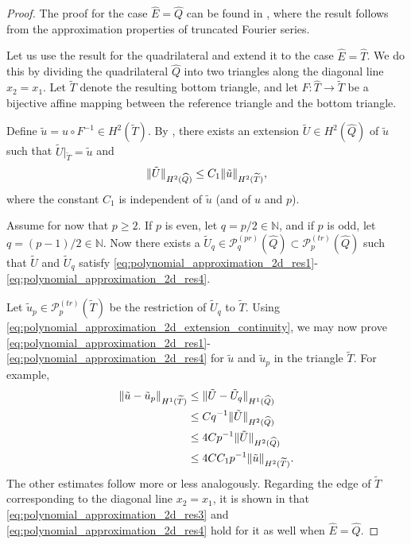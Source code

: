 \documentclass[english, 12pt, a4paper, sci, utf8, a-2b, online]{aaltothesis}
\theoremstyle{definition}
\theoremstyle{plain}
\DeclarePairedDelimiter\norm{\lVert}{\rVert}
\numberwithin{equation}{section}
\begin{document}
\begin{proof}
    The proof for the case $\widehat{E} = \widehat{Q}$
    can be found in \cite[Lemma 3.1]{babuskasuri1987},
    where the result follows from the approximation properties
    of truncated Fourier series.

    Let us use the result for the quadrilateral
    and extend it to the case $\widehat{E} = \widehat{T}$.
    We do this by
    dividing the quadrilateral $\widehat{Q}$ into two triangles
    along the diagonal line $x_2 = x_1$.
    Let $\widetilde{T}$ denote the resulting bottom triangle,
    and let $F: \widehat{T} \to \widetilde{T}$ be a bijective affine mapping
    between the reference triangle and the bottom triangle.
    
    Define $\tilde{u} = u \circ F^{-1} \in H^2(\widetilde{T})$.
    By \cite[Theorem 5 on p.\ 181]{stein1970},
    there exists an extension $\tilde{U} \in H^2(\widehat{Q})$ of $\tilde{u}$
    such that $\tilde{U}|_{\widetilde{T}} = \tilde{u}$ and
    \begin{equation}
        \label{eq:polynomial_approximation_2d_extension_continuity}
        \norm{\tilde{U}}_{H^2(\widehat{Q})}
        \leq C_1 \norm{\tilde{u}}_{H^2(\widetilde{T})},
    \end{equation}
    where the constant $C_1$ is independent of $\tilde{u}$ (and of $u$ and $p$).

    Assume for now that $p \geq 2$.
    If $p$ is even, let $q = p/2 \in \mathbb{N}$,
    and if $p$ is odd, let $q = (p-1)/2 \in \mathbb{N}$.
    Now there exists a $\tilde{U}_q \in \mathcal{P}_q^{(pr)}(\widehat{Q})
    \subset \mathcal{P}_p^{(tr)}(\widehat{Q})$
    such that $\tilde{U}$ and $\tilde{U}_q$ satisfy
    \eqref{eq:polynomial_approximation_2d_res1}-\eqref{eq:polynomial_approximation_2d_res4}.
    
    Let $\tilde{u}_p \in \mathcal{P}_p^{(tr)}(\widetilde{T})$
    be the restriction of $\tilde{U}_q$ to $\widetilde{T}$.
    Using \eqref{eq:polynomial_approximation_2d_extension_continuity},
    we may now prove
    \eqref{eq:polynomial_approximation_2d_res1}-\eqref{eq:polynomial_approximation_2d_res4}
    for $\tilde{u}$ and $\tilde{u}_p$ in the triangle $\widetilde{T}$.
    For example,
    \begin{align*}
        \norm{\tilde{u}-\tilde{u}_p}_{H^1(\widetilde{T})}
        &\leq \norm{\tilde{U}-\tilde{U}_q}_{H^1(\widehat{Q})} \\
        &\leq C q^{-1} \norm{\tilde{U}}_{H^2(\widehat{Q})} \\
        &\leq 4C p^{-1} \norm{\tilde{U}}_{H^2(\widehat{Q})} \\
        &\leq 4C C_1 p^{-1} \norm{\tilde{u}}_{H^2(\widetilde{T})}.
    \end{align*}
    The other estimates follow more or less analogously.
    Regarding the edge of $\widetilde{T}$
    corresponding to the diagonal line $x_2=x_1$,
    it is shown in \cite[Lemma 3.1]{babuskasuri1987} that
    \eqref{eq:polynomial_approximation_2d_res3}
    and \eqref{eq:polynomial_approximation_2d_res4}
    hold for it as well when $\widehat{E} = \widehat{Q}$.


\end{proof}
\end{document}

